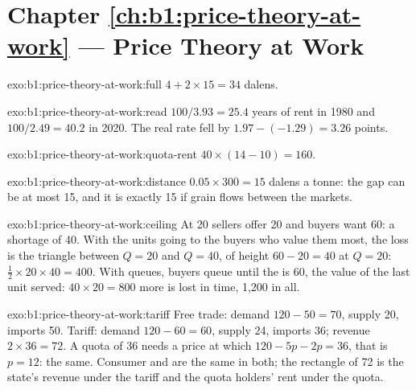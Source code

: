 \section*{Chapter \ref{ch:b1:price-theory-at-work} --- Price Theory at Work}

\begin{solution}{exo:b1:price-theory-at-work:full}
$4 + 2 \times 15 = 34$ dalens.
\end{solution}

\begin{solution}{exo:b1:price-theory-at-work:read}
$100/3.93 = 25.4$ years of rent in 1980 and $100/2.49 = 40.2$ in 2020. The real
rate fell by $1.97 - (-1.29) = 3.26$ points.
\end{solution}

\begin{solution}{exo:b1:price-theory-at-work:quota-rent}
$40 \times (14 - 10) = 160$.
\end{solution}

\begin{solution}{exo:b1:price-theory-at-work:distance}
$0.05 \times 300 = 15$ dalens a tonne: the gap can be at most 15, and it is
exactly 15 if grain flows between the markets.
\end{solution}

\begin{solution}{exo:b1:price-theory-at-work:ceiling}
At 20 sellers offer 20 and buyers want 60: a shortage of 40. With the units
going to the buyers who value them most, the loss is the triangle between
$Q = 20$ and $Q = 40$, of height $60 - 20 = 40$ at $Q = 20$: $\tfrac12 \times 20 \times 40 = 400$. With
queues, buyers queue until the  is 60, the value of the last
unit served: $40 \times 20 = 800$ more is lost in time, 1,200 in all.
\end{solution}

\begin{solution}{exo:b1:price-theory-at-work:tariff}
Free trade: demand $120 - 50 = 70$, supply 20, imports 50. Tariff: demand $120 - 60 = 60$,
supply 24, imports 36; revenue $2 \times 36 = 72$. A quota of 36 needs a price at
which $120 - 5p - 2p = 36$, that is $p = 12$: the same. Consumer and  are the same in both; the rectangle of 72 is the state's revenue
under the tariff and the quota holders' rent under the quota.
\end{solution}

